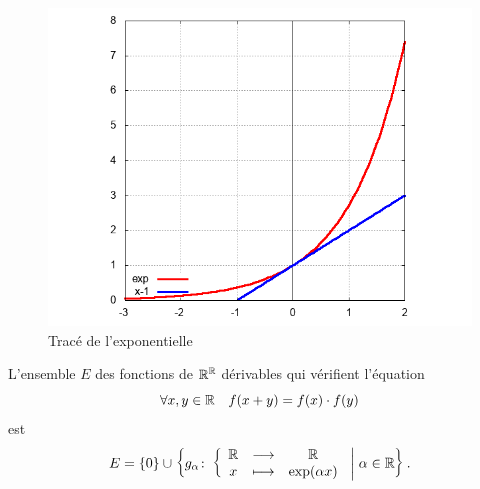 \begin{figure}
  \centering
  \includegraphics[scale=0.4,angle=-90]{exp.png}
  \caption{Tracé de l'exponentielle}
  \label{fig:traceexp}
\end{figure}
%
\begin{theo}
  L'ensemble $E$ des fonctions de $\mathbb{R}^{\mathbb{R}}$ dérivables qui vérifient l'équation
  \begin{equation}
    \label{eq:foncexp}
    \forall x, y \in \mathbb{R} \quad f(x+y)=f(x) \cdot f(y)
  \end{equation}
  est
  \begin{equation}
    E=\left\{0\right\} \cup \left\{g_{\alpha}\colon \left\{\begin{array}{ccc} \mathbb{R} & \longrightarrow &\mathbb{R}\\ x & \longmapsto & \exp(\alpha x) \end{array} \right.\mathrel{}\middle|\mathrel{}\alpha \in \mathbb{R}\right\}.
  \end{equation}
\end{theo}

